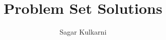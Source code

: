 \begin{titlepage}
    \title{Problem Set Solutions}
    \author{Sagar Kulkarni}
    \maketitle

\end{titlepage}